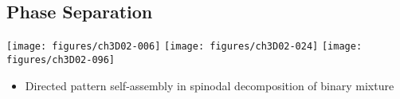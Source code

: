 \subsection*{Phase Separation}
\begin{frame}[t]
  \begin{center}
    \texttt{[image: figures/ch3D02-006]}    
    \texttt{[image: figures/ch3D02-024]}    
    \texttt{[image: figures/ch3D02-096]}    
  \end{center}

  \begin{block}{}
    \begin{itemize}
    \item{%
      Directed pattern self-assembly in spinodal decomposition of binary
mixture
      }
      \end{itemize}
  \end{block}
\end{frame}


